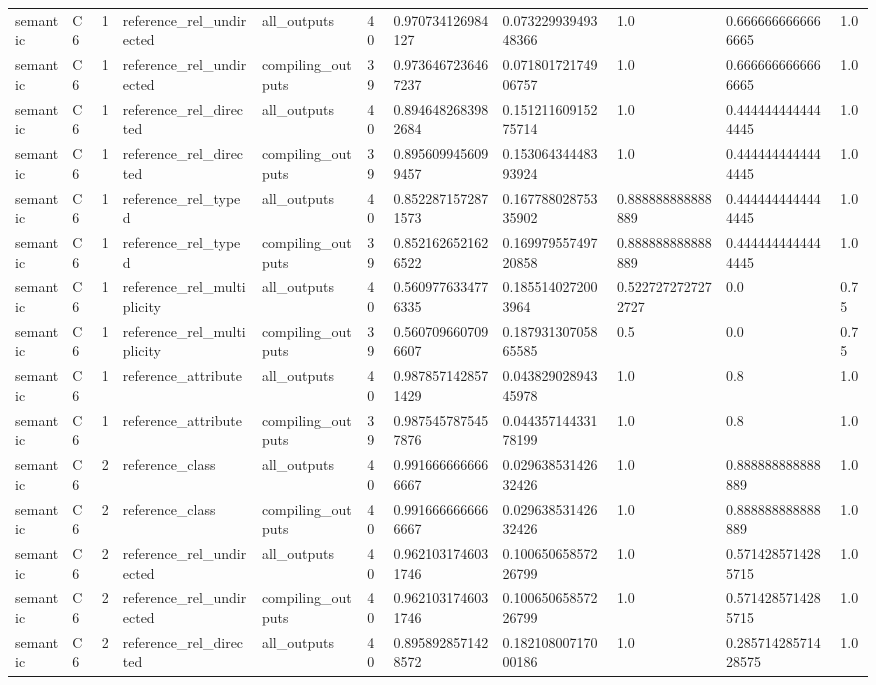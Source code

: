 \begin{tabular}{lllllllllll}
semantic & C6 & 1 & reference\_rel\_undirected & all\_outputs & 40 & 0.970734126984127 & 0.07322993949348366 & 1.0 & 0.6666666666666665 & 1.0 \\
semantic & C6 & 1 & reference\_rel\_undirected & compiling\_outputs & 39 & 0.9736467236467237 & 0.07180172174906757 & 1.0 & 0.6666666666666665 & 1.0 \\
semantic & C6 & 1 & reference\_rel\_directed & all\_outputs & 40 & 0.8946482683982684 & 0.15121160915275714 & 1.0 & 0.4444444444444445 & 1.0 \\
semantic & C6 & 1 & reference\_rel\_directed & compiling\_outputs & 39 & 0.8956099456099457 & 0.15306434448393924 & 1.0 & 0.4444444444444445 & 1.0 \\
semantic & C6 & 1 & reference\_rel\_typed & all\_outputs & 40 & 0.8522871572871573 & 0.16778802875335902 & 0.888888888888889 & 0.4444444444444445 & 1.0 \\
semantic & C6 & 1 & reference\_rel\_typed & compiling\_outputs & 39 & 0.8521626521626522 & 0.16997955749720858 & 0.888888888888889 & 0.4444444444444445 & 1.0 \\
semantic & C6 & 1 & reference\_rel\_multiplicity & all\_outputs & 40 & 0.5609776334776335 & 0.1855140272003964 & 0.5227272727272727 & 0.0 & 0.75 \\
semantic & C6 & 1 & reference\_rel\_multiplicity & compiling\_outputs & 39 & 0.5607096607096607 & 0.18793130705865585 & 0.5 & 0.0 & 0.75 \\
semantic & C6 & 1 & reference\_attribute & all\_outputs & 40 & 0.9878571428571429 & 0.04382902894345978 & 1.0 & 0.8 & 1.0 \\
semantic & C6 & 1 & reference\_attribute & compiling\_outputs & 39 & 0.9875457875457876 & 0.04435714433178199 & 1.0 & 0.8 & 1.0 \\
semantic & C6 & 2 & reference\_class & all\_outputs & 40 & 0.9916666666666667 & 0.02963853142632426 & 1.0 & 0.888888888888889 & 1.0 \\
semantic & C6 & 2 & reference\_class & compiling\_outputs & 40 & 0.9916666666666667 & 0.02963853142632426 & 1.0 & 0.888888888888889 & 1.0 \\
semantic & C6 & 2 & reference\_rel\_undirected & all\_outputs & 40 & 0.9621031746031746 & 0.10065065857226799 & 1.0 & 0.5714285714285715 & 1.0 \\
semantic & C6 & 2 & reference\_rel\_undirected & compiling\_outputs & 40 & 0.9621031746031746 & 0.10065065857226799 & 1.0 & 0.5714285714285715 & 1.0 \\
semantic & C6 & 2 & reference\_rel\_directed & all\_outputs & 40 & 0.8958928571428572 & 0.18210800717000186 & 1.0 & 0.28571428571428575 & 1.0 \\

\end{tabular}
